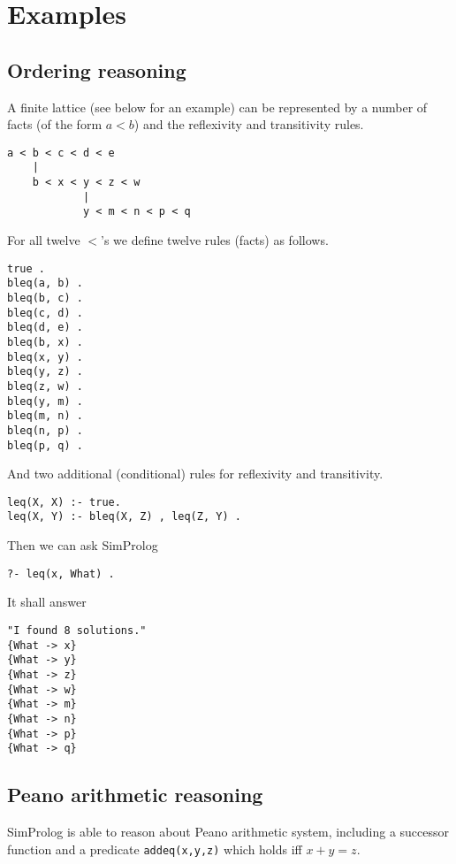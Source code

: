 \documentclass{article}
\begin{document}
\section{Examples}

\subsection{Ordering reasoning}
A finite lattice (see below for an example) can be represented by a number of facts (of the form $a < b$) and the reflexivity and transitivity rules.

{\tt \begin{lstlisting}[xleftmargin=.2\textwidth]
a < b < c < d < e
    |
    b < x < y < z < w
            |
            y < m < n < p < q
\end{lstlisting}}

For all twelve $<$'s we define twelve rules (facts) as follows.

\begin{verbatim}
true .
bleq(a, b) .
bleq(b, c) .
bleq(c, d) .
bleq(d, e) .
bleq(b, x) .
bleq(x, y) .
bleq(y, z) .
bleq(z, w) .
bleq(y, m) .
bleq(m, n) .
bleq(n, p) .
bleq(p, q) .
\end{verbatim}

And two additional (conditional) rules for reflexivity and transitivity.

\begin{verbatim}
leq(X, X) :- true.
leq(X, Y) :- bleq(X, Z) , leq(Z, Y) .
\end{verbatim}

Then we can ask SimProlog

\begin{verbatim}
?- leq(x, What) .
\end{verbatim}

It shall answer

\begin{verbatim}
"I found 8 solutions."
{What -> x}
{What -> y}
{What -> z}
{What -> w}
{What -> m}
{What -> n}
{What -> p}
{What -> q}
\end{verbatim}


\subsection{Peano arithmetic reasoning}

SimProlog is able to reason about Peano arithmetic system, including a successor function and a predicate {\tt addeq(x,y,z)} which holds iff $x + y = z$.
\end{document}
